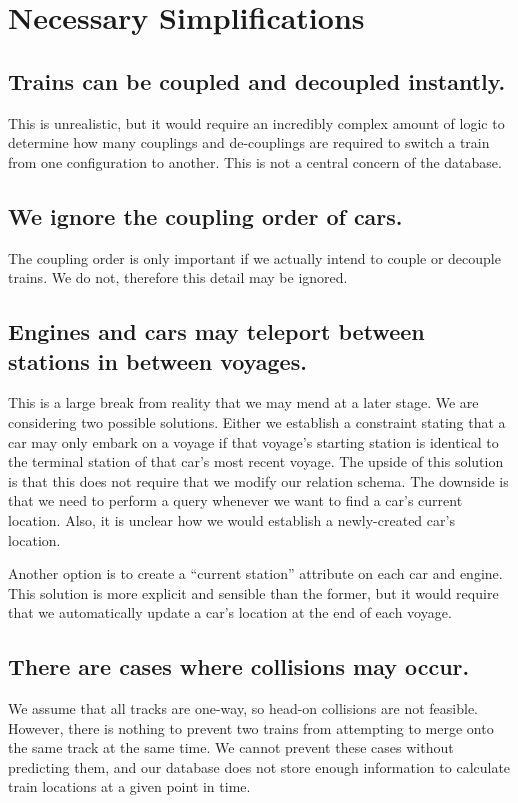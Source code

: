 \documentclass[a4paper]{article}
\begin{document}
\section{Necessary Simplifications}

\subsection*{Trains can be coupled and decoupled instantly.}
This is unrealistic, but it would require an incredibly complex amount of logic to determine how many couplings and de-couplings are required to switch a train from one configuration to another. This is not a central concern of the database. 

\subsection*{We ignore the coupling order of cars.}
The coupling order is only important if we actually intend to couple or decouple trains. We do not, therefore this detail may be ignored.

\subsection*{Engines and cars may teleport between stations in between voyages.}
This is a large break from reality that we may mend at a later stage. We are considering two possible solutions. Either we establish a constraint stating that a car may only embark on a voyage if that voyage’s starting station is identical to the terminal station of that car’s most recent voyage. The upside of this solution is that this does not require that we modify our relation schema. The downside is that we need to perform a query whenever we want to find a car’s current location. Also, it is unclear how we would establish a newly-created car’s location.

Another option is to create a “current station” attribute on each car and engine. This solution is more explicit and sensible than the former, but it would require that we automatically update a car’s location at the end of each voyage. 

\subsection*{There are cases where collisions may occur.}
	We assume that all tracks are one-way, so head-on collisions are not feasible. However, there is nothing to prevent two trains from attempting to merge onto the same track at the same time. We cannot prevent these cases without predicting them, and our database does not store enough information to calculate train locations at a given point in time.
\end{document}
